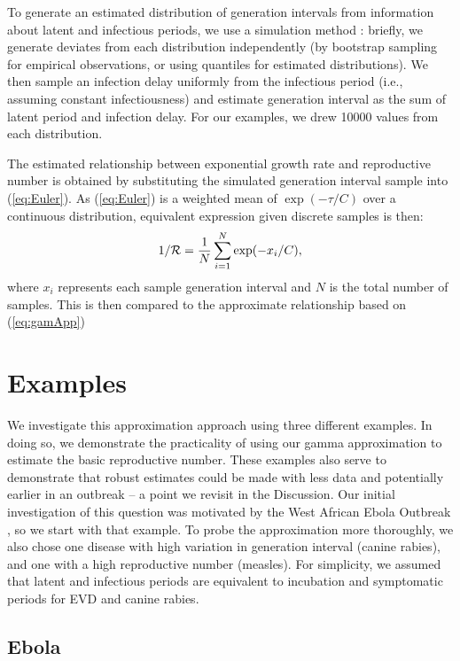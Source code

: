 \documentclass[12pt]{article}
\newcommand{\RR}{\ensuremath{{\cal R}}}
\newcommand{\eref}[1]{(\ref{eq:#1})}
\begin{document}
To generate an estimated distribution of generation intervals from information about latent and infectious periods, we use a simulation method \cite{HampDush09}: briefly, we generate deviates from each distribution independently (by bootstrap sampling for empirical observations, or using quantiles for estimated distributions). 
We then sample an infection delay uniformly from the infectious period (i.e., assuming constant infectiousness) and estimate generation interval as the sum of latent period and infection delay.  
For our examples, we drew 10000 values from each distribution. 

The estimated relationship between exponential growth rate and reproductive number is obtained by substituting the simulated generation interval sample into \eref{Euler}.
As \eref{Euler} is a weighted mean of $\exp(-\tau/C)$ over a continuous distribution, equivalent expression given discrete samples is then:
\begin{equation}
1/\RR = \frac{1}{N} \sum_{i=1}^{N} \exp(-x_i/C),
\label{eq:obsR}
\end{equation}
where $x_i$ represents each sample generation interval and $N$ is the total number of samples. 
This is then compared to the approximate relationship based on \eref{gamApp}

\section{Examples}

We investigate this approximation approach using three different examples. 
In doing so, we demonstrate the practicality of using our gamma approximation to estimate the basic reproductive number. 
These examples also serve to demonstrate that robust estimates could be made with less data and potentially earlier in an outbreak -- a point we revisit in the Discussion.
Our initial investigation of this question was motivated by the West African Ebola Outbreak \cite{WeitDush15}, so we start with that example. To probe the approximation more thoroughly, we also chose one disease with high variation in generation interval (canine rabies), and one with a high reproductive number (measles). 
For simplicity, we assumed that latent and infectious periods are equivalent to incubation and symptomatic periods for EVD and canine rabies.

\subsection{Ebola}
\label{EbolaEx}
\end{document}
